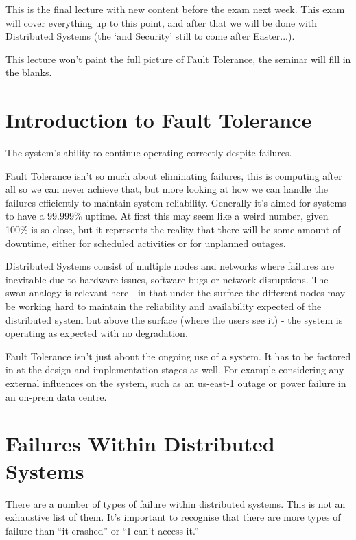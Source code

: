 
This is the final lecture with new content before the exam next week. This exam will cover everything up to this point, and after that we will be done with Distributed Systems (the `and Security' still to come after Easter...). 

This lecture won't paint the full picture of Fault Tolerance, the seminar will fill in the blanks. 

\section{Introduction to Fault Tolerance}
\begin{define}
\item[Fault Tolerance] The system's ability to continue operating correctly despite failures.
\end{define}

Fault Tolerance isn't so much about eliminating failures, this is computing after all so we can never achieve that, but more looking at how we can handle the failures efficiently to maintain system reliability. Generally it's aimed for systems to have a 99.999\% uptime. At first this may seem like a weird number, given 100\% is so close, but it represents the reality that there will be some amount of downtime, either for scheduled activities or for unplanned outages. 

Distributed Systems consist of multiple nodes and networks where failures are inevitable due to hardware issues, software bugs or network disruptions. The swan analogy is relevant here - in that under the surface the different nodes may be working hard to maintain the reliability and availability expected of the distributed system but above the surface (where the users see it) - the system is operating as expected with no degradation. 

Fault Tolerance isn't just about the ongoing use of a system. It has to be factored in at the design and implementation stages as well. For example considering any external influences on the system, such as an us-east-1 outage or power failure in an on-prem data centre. 

\section{Failures Within Distributed Systems}
There are a number of types of failure within distributed systems. This is not an exhaustive list of them. It's important to recognise that there are more types of failure than ``it crashed'' or ``I can't access it.''

